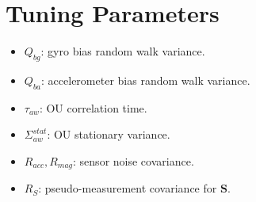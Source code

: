 \documentclass[11pt]{article}
\begin{document}
\section{Tuning Parameters}
\begin{itemize}
\item $Q_{bg}$: gyro bias random walk variance.
\item $Q_{ba}$: accelerometer bias random walk variance.
\item $\tau_{aw}$: OU correlation time.
\item $\Sigma_{aw}^{stat}$: OU stationary variance.
\item $R_{acc},R_{mag}$: sensor noise covariance.
\item $R_S$: pseudo-measurement covariance for $\bm S$.
\end{itemize}
\end{document}
